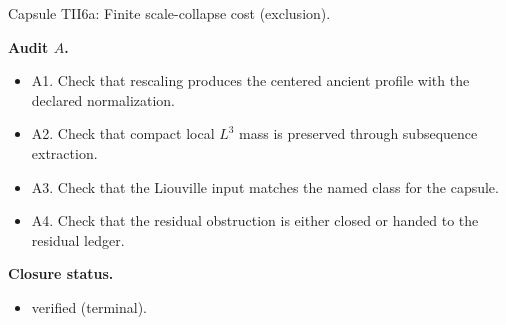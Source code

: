 \documentclass[11pt]{amsart}
\newcommand{\capsulefield}[1]{\par\smallskip\noindent\textbf{#1.}\ }
\begin{document}
\begin{proofcapsule}{Capsule TII6a: Finite scale-collapse cost (exclusion).}
  \capsulefield{Audit \(A\)}
  \begin{itemize}[leftmargin=1.8em]
  \item A1. Check that rescaling produces the centered ancient profile with the declared normalization.
  \item A2. Check that compact local $L^3$ mass is preserved through subsequence extraction.
  \item A3. Check that the Liouville input matches the named class for the capsule.
  \item A4. Check that the residual obstruction is either closed or handed to the residual ledger.
  \end{itemize}
  \capsulefield{Closure status}
  \begin{itemize}[leftmargin=1.8em]
  \item verified (terminal).
  \end{itemize}
\end{proofcapsule}
\end{document}
